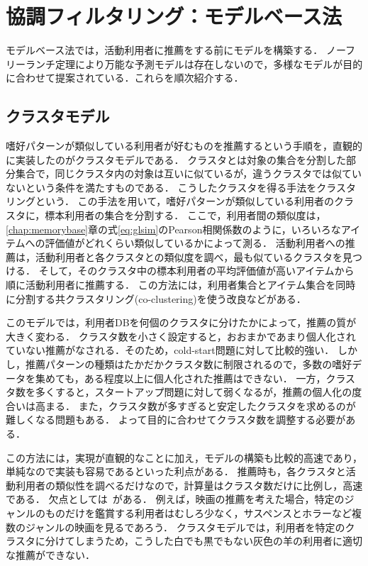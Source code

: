 \chapter{協調フィルタリング：モデルベース法}
\label{chap:modelbase}

モデルベース法では，活動利用者に推薦をする前にモデルを構築する．
ノーフリーランチ定理により万能な予測モデルは存在しないので，多様なモデルが目的に合わせて提案されている．これらを順次紹介する．

\section{クラスタモデル}
\label{sec:clustermodel}

嗜好パターンが類似している利用者が好むものを推薦するという手順を，直観的に実装したのがクラスタモデルである\cite{uai:98:01,epublist:039}．
クラスタとは対象の集合を分割した部分集合で，同じクラスタ内の対象は互いに似ているが，違うクラスタでは似ていないという条件を満たすものである．
こうしたクラスタを得る手法をクラスタリングという\cite{jpublist:034,jb:038:00,j:0051}．
この手法を用いて，嗜好パターンが類似している利用者のクラスタに，標本利用者の集合を分割する．
ここで，利用者間の類似度は，\ref{chap:memorybase}章の式\eqref{eq:glsim}のPearson相関係数のように，いろいろなアイテムへの評価値がどれくらい類似しているかによって測る．
活動利用者への推薦は，活動利用者と各クラスタとの類似度を調べ，最も似ているクラスタを見つける．
そして，そのクラスタ中の標本利用者の平均評価値が高いアイテムから順に活動利用者に推薦する．
この方法には，利用者集合とアイテム集合を同時に分割する共クラスタリング(co-clustering)を使う改良\cite{icdm:05:05}などがある．

このモデルでは，利用者DBを何個のクラスタに分けたかによって，推薦の質が大きく変わる．
クラスタ数を小さく設定すると，おおまかであまり個人化されていない推薦がなされる．そのため，cold-start問題に対して比較的強い．
しかし，推薦パターンの種類はたかだかクラスタ数に制限されるので，多数の嗜好データを集めても，ある程度以上に個人化された推薦はできない．
一方，クラスタ数を多くすると，スタートアップ問題に対して弱くなるが，推薦の個人化の度合いは高まる．
また，クラスタ数が多すぎると安定したクラスタを求めるのが難しくなる問題もある．
よって目的に合わせてクラスタ数を調整する必要がある．

この方法には，実現が直観的なことに加え，モデルの構築も比較的高速であり，単純なので実装も容易であるといった利点がある．
推薦時も，各クラスタと活動利用者の類似性を調べるだけなので，計算量はクラスタ数だけに比例し，高速である．
欠点としては~\cite{ej:048}がある．
例えば，映画の推薦を考えた場合，特定のジャンルのものだけを鑑賞する利用者はむしろ少なく，サスペンスとホラーなど複数のジャンルの映画を見るであろう．
クラスタモデルでは，利用者を特定のクラスタに分けてしまうため，こうした白でも黒でもない灰色の羊の利用者に適切な推薦ができない．

